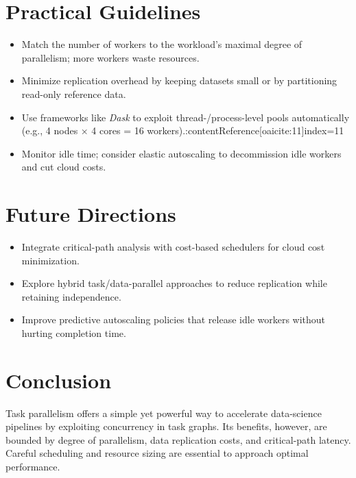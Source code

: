 \documentclass[11pt]{article}
\begin{document}
\section{Practical Guidelines}

\begin{itemize}[itemsep=0pt]
  \item Match the number of workers to the workload’s maximal degree of parallelism; more workers waste resources.
  \item Minimize replication overhead by keeping datasets small or by partitioning read-only reference data.
  \item Use frameworks like \emph{Dask} to exploit thread-/process-level pools automatically (e.g., 4 nodes × 4 cores = 16 workers).:contentReference[oaicite:11]{index=11}
  \item Monitor idle time; consider elastic autoscaling to decommission idle workers and cut cloud costs.
\end{itemize}

\section{Future Directions}

\begin{itemize}[itemsep=0pt]
  \item Integrate critical-path analysis with cost-based schedulers for cloud cost minimization.
  \item Explore hybrid task/data-parallel approaches to reduce replication while retaining independence.
  \item Improve predictive autoscaling policies that release idle workers without hurting completion time.
\end{itemize}

\section*{Conclusion}

Task parallelism offers a simple yet powerful way to accelerate data-science pipelines by exploiting concurrency in task graphs.  Its benefits, however, are bounded by degree of parallelism, data replication costs, and critical-path latency.  Careful scheduling and resource sizing are essential to approach optimal performance.
\end{document}
